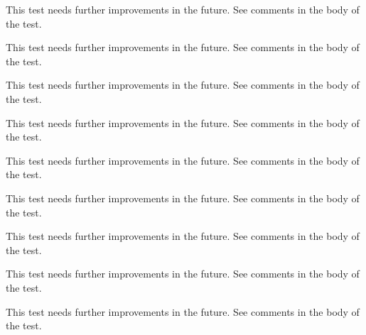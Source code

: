 \begin{DoxyRefList}
%
 This test needs further improvements in the future. See comments in the body of the test.  
\item[Subprogram \mbox{\hyperlink{namespaceTest__System__mod_a26054fb4e3bf2d05710adc7965bc8431}{Test\+\_\+\+System\+\_\+mod\+::test\+\_\+\+Env\+Var\+\_\+type\+\_\+3}} ()]\label{todo__todo000086}%
%
 This test needs further improvements in the future. See comments in the body of the test.  
\item[Subprogram \mbox{\hyperlink{namespaceTest__System__mod_a8d37f80583c104a3dfb6b99a897feb26}{Test\+\_\+\+System\+\_\+mod\+::test\+\_\+execute\+Cmd\+\_\+1}} ()]\label{todo__todo000092}%
%
 This test needs further improvements in the future. See comments in the body of the test.  
\item[Subprogram \mbox{\hyperlink{namespaceTest__System__mod_a733db17082cd5058dbc8d19e6f620909}{Test\+\_\+\+System\+\_\+mod\+::test\+\_\+execute\+Cmd\+\_\+2}} ()]\label{todo__todo000093}%
%
 This test needs further improvements in the future. See comments in the body of the test.  
\item[Subprogram \mbox{\hyperlink{namespaceTest__System__mod_a9a276bf5a7b9db66c140bd2202ebc7e9}{Test\+\_\+\+System\+\_\+mod\+::test\+\_\+get\+System\+Info\+\_\+1}} ()]\label{todo__todo000094}%
%
 This test needs further improvements in the future. See comments in the body of the test.  
\item[Subprogram \mbox{\hyperlink{namespaceTest__System__mod_aabfd080659733c4a852c62ccd400599b}{Test\+\_\+\+System\+\_\+mod\+::test\+\_\+\+OS\+\_\+type\+\_\+1}} ()]\label{todo__todo000088}%
%
 This test needs further improvements in the future. See comments in the body of the test.  
\item[Subprogram \mbox{\hyperlink{namespaceTest__System__mod_a86976d55b3a779d9a8c0064155e9cd4a}{Test\+\_\+\+System\+\_\+mod\+::test\+\_\+\+OS\+\_\+type\+\_\+2}} ()]\label{todo__todo000089}%
%
 This test needs further improvements in the future. See comments in the body of the test.  
\item[Subprogram \mbox{\hyperlink{namespaceTest__System__mod_ada729e6f3789a1df730ac21f58d5a334}{Test\+\_\+\+System\+\_\+mod\+::test\+\_\+\+OS\+\_\+type\+\_\+3}} ()]\label{todo__todo000090}%
%
 This test needs further improvements in the future. See comments in the body of the test.  
\item[Subprogram \mbox{\hyperlink{namespaceTest__System__mod_a6ba8a4348e2457b775dd061d40f33cb8}{Test\+\_\+\+System\+\_\+mod\+::test\+\_\+\+Sys\+Cmd\+\_\+type\+\_\+1}} ()]\label{todo__todo000091}%
%
 This test needs further improvements in the future. See comments in the body of the test. 
\end{DoxyRefList}